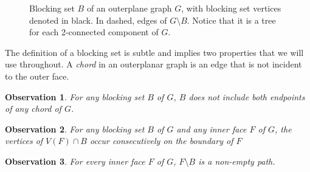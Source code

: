 \documentclass{patmorin}
\newtheorem{obs}{Observation}[theorem]
\begin{document}
\begin{figure}[!ht]
  \centering
  
  
   \caption{Blocking set $B$ of an outerplane graph $G$, with blocking set vertices denoted in black. In dashed, edges of $G\setminus B$. Notice that it is a tree for each 2-connected component of $G$.}

  \label{fig:blocking_set}  
\end{figure}

The definition of a blocking set is subtle and implies two properties
that
 we will use throughout.
 A \emph{chord} in an outerplanar graph
is an edge that is not incident
 to the outer face.


\begin{obs}
   For any blocking set $B$ of $G$, $B$ does not include both endpoints
   of any chord of $G$.
\end{obs}

\begin{obs}
   For any blocking set $B$ of $G$ and any inner face $F$ of $G$, the
   vertices of $V(F)\cap B$ occur consecutively on the boundary of $F$ 
\end{obs}

\begin{obs}
  For every inner face $F$ of $G$, $F \setminus B$ is a non-empty path.
  \label{claim:facesMinusBarePaths}
\end{obs}
 
\end{document}
